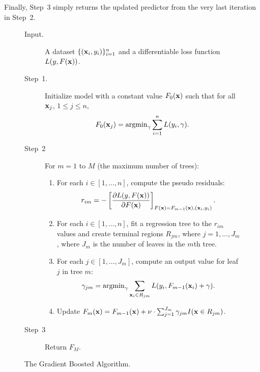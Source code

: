 Finally, Step~3 simply returns the updated predictor from the very last iteration
in Step~2.

\begin{figure}[th!]
{\small
\begin{description}
    \item[Input.] A dataset $\{(\mathbf{x}_i, y_i)\}_{i = 1}^{n}$ and a 
        differentiable loss function $L(y, F(\mathbf{x}))$.
    
    \item[Step~1.] Initialize model with a constant value $F_0(\mathbf{x})$ such
        that for all $\mathbf{x}_j$, $1 \leq j \leq n$,
        \begin{equation}
            F_0(\mathbf{x}_j) = \operatorname{argmin}_{\gamma} \sum_{i = 1}^{n} L(y_i, \gamma).
        \end{equation}   
    \item[Step~2] For $m = 1$ to $M$ (the maximum number of trees):
        \begin{enumerate}
            \item For each $i \in [1, \ldots, n]$, compute the pseudo residuals:
                \begin{equation} \label{eqn:pseudo_residuals}
                    r_{i m} = 
                            - \left [ 
                                \frac{\partial L(y, F(\mathbf{x}))}{\partial F(\mathbf{x})} 
                              \right ]_{F(\mathbf{x}) = F_{m - 1}(\mathbf{x}), (\mathbf{x}_i, y_i)}.
                \end{equation}
            \item For each $i \in [1, \ldots, n]$, fit a regression tree to the 
                $r_{i m}$ values and create terminal regions $R_{j m}$, where 
                $j = 1, \ldots, J_m$, where $J_m$ is the number of leaves in the 
                $m$th tree.
            \item For each $j \in [1, \ldots, J_m]$, compute an output value for 
                leaf $j$ in tree $m$:
                \begin{equation}
                    \label{eqn:leaf_values}
                    \gamma_{j m} = \operatorname{argmin}_{\gamma} 
                            \sum_{\mathbf{x}_i \in R_{j m}} L(y_i, F_{m - 1}(\mathbf{x}_i) + \gamma).
                \end{equation}
            \item Update $F_m(\mathbf{x}) = F_{m - 1}(\mathbf{x}) + 
                \nu \cdot \sum_{j = 1}^{J_m} \gamma_{j m} I(\mathbf{x} \in R_{j m})$.
        \end{enumerate}
    \item[Step~3] Return $F_M$.
\end{description}
}
 \caption{The Gradient Boosted Algorithm.}
\label{fig:gbm_algo}
\end{figure}


